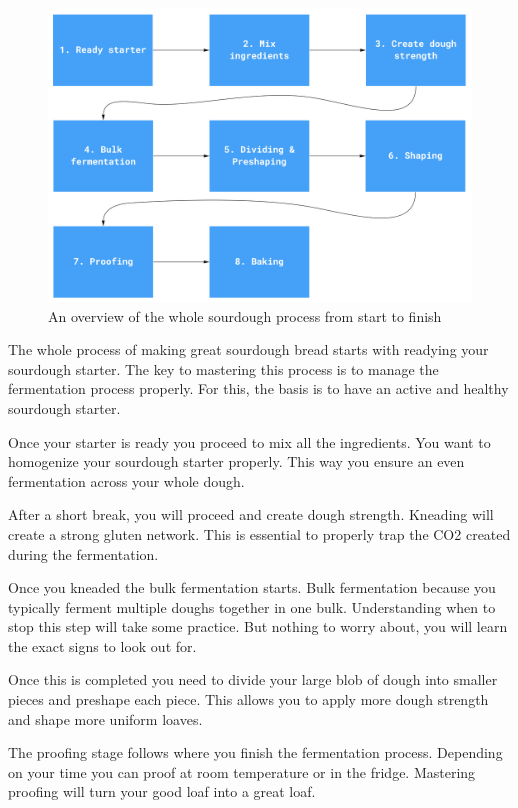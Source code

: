 \begin{figure}[!htb]
  \includegraphics[width=\textwidth]{sourdough-process-overview}
  \caption{An overview of the whole sourdough process from start to finish}
\end{figure}

The whole process of making great sourdough bread starts with
readying your sourdough starter. The key to mastering
this process is to manage the fermentation process properly.
For this, the basis is to have an active and healthy
sourdough starter.

Once your starter is ready you proceed to mix all the ingredients.
You want to homogenize your sourdough starter properly. This
way you ensure an even fermentation across your whole dough.

After a short break, you will proceed and create dough strength.
Kneading will create a strong gluten network. This is essential
to properly trap the CO2 created during the fermentation.

Once you kneaded the bulk fermentation starts. Bulk fermentation
because you typically ferment multiple doughs together in one bulk.
Understanding when to stop this step will take some practice.
But nothing to worry about, you will learn the exact signs to look out for.

Once this is completed you need to divide your large blob of
dough into smaller pieces and preshape each piece. This allows
you to apply more dough strength and shape more uniform loaves.

The proofing stage follows where you finish the fermentation process.
Depending on your time you can proof at room temperature or in the fridge.
Mastering proofing will turn your good loaf into a great loaf.

